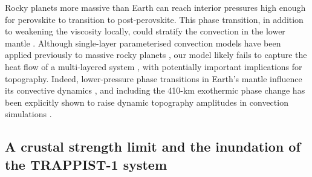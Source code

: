 Rocky planets more massive than Earth can reach interior pressures high enough for perovskite to transition to post-perovskite. This phase transition, in addition to weakening the viscosity locally, could stratify the convection in the lower mantle \citep{umemoto_twostage_2011, karato_rheological_2011, tackley_mantle_2013, umemoto_phase_2017, shahnas_penetrative_2018, ritterbex_vacancies_2018, vandenberg_massdependent_2019}. Although single-layer parameterised convection models have been applied previously to massive rocky planets \citep[e.g.,][]{kite2009geodynamics, tosi_habitability_2017}, our model likely fails to capture the heat flow of a multi-layered system \citep{2007GeoJI.169..747V}, with potentially important implications for topography. Indeed, lower-pressure phase transitions in Earth's mantle influence its convective dynamics \citep{doi:10.1146/annurev.ea.23.050195.000433}, and including the 410-km exothermic phase change has been explicitly shown to raise dynamic topography amplitudes in convection simulations \citep{2021GeoJI.225.1637Y}.






\subsection{A crustal strength limit and the inundation of the TRAPPIST-1 system}


